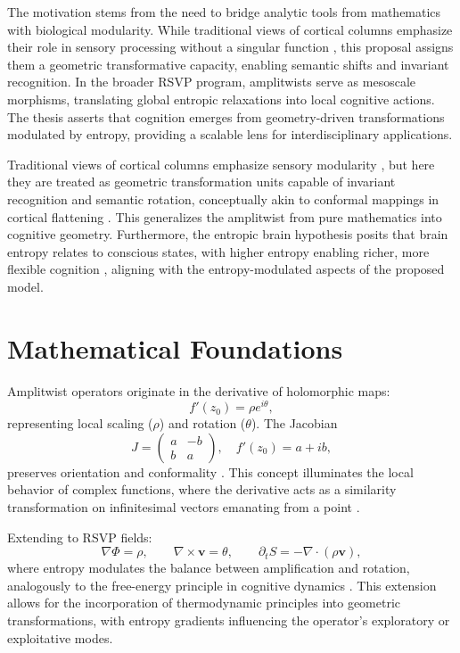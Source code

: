 \documentclass[11pt]{article}
\begin{document}
The motivation stems from the need to bridge analytic tools from mathematics with biological modularity. While traditional views of cortical columns emphasize their role in sensory processing without a singular function \citep{horton2005cortical}, this proposal assigns them a geometric transformative capacity, enabling semantic shifts and invariant recognition. In the broader RSVP program, amplitwists serve as mesoscale morphisms, translating global entropic relaxations into local cognitive actions. The thesis asserts that cognition emerges from geometry-driven transformations modulated by entropy, providing a scalable lens for interdisciplinary applications.

Traditional views of cortical columns emphasize sensory modularity \citep{horton2005cortical,rockland2010cortical}, but here they are treated as geometric transformation units capable of invariant recognition and semantic rotation, conceptually akin to conformal mappings in cortical flattening \citep{gu2004genus}. This generalizes the amplitwist from pure mathematics into cognitive geometry. Furthermore, the entropic brain hypothesis posits that brain entropy relates to conscious states, with higher entropy enabling richer, more flexible cognition \citep{carhart2014entropic}, aligning with the entropy-modulated aspects of the proposed model.

\section{Mathematical Foundations}
Amplitwist operators originate in the derivative of holomorphic maps:
\[
f'(z_0) = \rho e^{i\theta},
\]
representing local scaling ($\rho$) and rotation ($\theta$). The Jacobian
\[
J = 
\begin{pmatrix}
a & -b\\
b & a
\end{pmatrix}, \quad f'(z_0) = a+ib,
\]
preserves orientation and conformality \citep{needham1997visual}. This concept illuminates the local behavior of complex functions, where the derivative acts as a similarity transformation on infinitesimal vectors emanating from a point \citep{needham1997visual}.

Extending to RSVP fields:
\[
\nabla \Phi = \rho, \qquad \nabla \times \mathbf{v} = \theta, \qquad \partial_t S = -\nabla \cdot (\rho \mathbf{v}),
\]
where entropy modulates the balance between amplification and rotation, analogously to the free-energy principle in cognitive dynamics \citep{friston2010free}. This extension allows for the incorporation of thermodynamic principles into geometric transformations, with entropy gradients influencing the operator's exploratory or exploitative modes.
\end{document}
